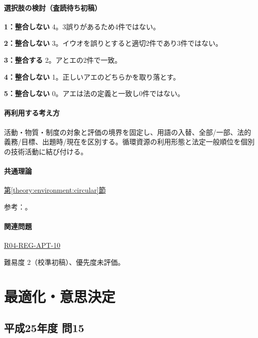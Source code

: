 \paragraph{選択肢の検討（査読待ち初稿）}\mbox{}\par

\noindent\textbf{1：整合しない} 4。3誤りがあるため4件ではない。\par

\noindent\textbf{2：整合しない} 3。イウオを誤りとすると適切2件であり3件ではない。\par

\noindent\textbf{3：整合する} 2。アとエの2件で一致。\par

\noindent\textbf{4：整合しない} 1。正しいアエのどちらかを取り落とす。\par

\noindent\textbf{5：整合しない} 0。アエは法の定義と一致し0件ではない。\par

\paragraph{再利用する考え方} 活動・物質・制度の対象と評価の境界を固定し、用語の入替、全部/一部、法的義務/目標、出題時/現在を区別する。循環資源の利用形態と法定一般順位を個別の技術活動に結び付ける。

\paragraph{共通理論} \hyperref[theory:environment:circular]{第\ref*{theory:environment:circular}節}

\par 参考：\cite{env_circular_law}。

\paragraph{関連問題} \hyperref[q:r04-reg-apt-10]{R04-REG-APT-10}

\par 難易度 2（校準初稿）、優先度未評価。

\section{最適化・意思決定}

\subsection{平成25年度 問15}
\label{q:h25-reg-apt-15}

